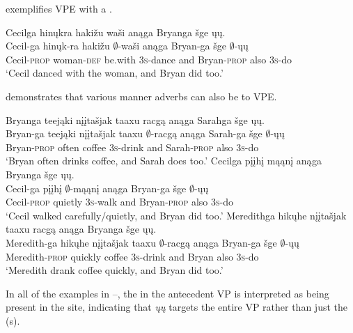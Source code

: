 \documentclass[output=paper]{LSP/langsci}
\begin{document}
 exemplifies VPE with a .
 
\ea\label{ex:johnson:9} 
\glll Cecilga {\ob}{\sVP} hinųkra hakižu waši{\cb} anąga Bryanga šge {\ob}ųų{\cb}.\\
Cecil-ga {} hinųk-ra hakižu $\emptyset$-waši anąga Bryan-ga šge {\db}$\emptyset$-ųų\\
Cecil-\textsc{prop} {} woman-\textsc{def} be.with \textsc{3s}-dance and Bryan-\textsc{prop} also {\db}\textsc{3s}-do\\
\trans `Cecil danced with the woman, and Bryan did too.'
\z

 demonstrates that various manner adverbs can also be  to VPE.
 
\ea\label{ex:johnson:10}
\ea 
\glll Bryanga  {\ob}{\sVP} teejąki {nįįtašjak taaxu} racgą{\cb} anąga Sarahga šge {\ob}ųų{\cb}.\\ 
Bryan-ga {} teejąki {nįįtašjak taaxu} $\emptyset$-racgą anąga Sarah-ga šge {\db}$\emptyset$-ųų\\
Bryan-\textsc{prop} {} often coffee \textsc{3s}-drink and Sarah-\textsc{prop} also {\db}\textsc{3s}-do\\
\trans `Bryan often drinks coffee, and Sarah does too.'
\ex 
\glll Cecilga  {\ob}{\sVP} pįįhį mąąnį{\cb} anąga Bryanga šge {\ob}ųų{\cb}.\\
Cecil-ga {} pįįhį $\emptyset$-mąąnį anąga Bryan-ga šge {\db}$\emptyset$-ųų\\
Cecil-\textsc{prop} {} quietly \textsc{3s}-walk and Bryan-\textsc{prop} also {\db}\textsc{3s}-do\\
\trans `Cecil walked carefully/quietly, and Bryan did too.'
\ex 
\glll Meredithga {\ob}{\sVP} hikųhe {nįįtašjak taaxu} racgą{\cb} anąga Bryanga šge {\ob}ųų{\cb}.\\
Meredith-ga {} hikųhe {nįįtašjak taaxu} $\emptyset$-racgą anąga Bryan-ga šge {\db}$\emptyset$-ųų\\
Meredith-\textsc{prop} {} quickly coffee \textsc{3s}-drink and Bryan also {\db}\textsc{3s}-do\\
\trans `Meredith drank coffee quickly, and Bryan did too.'
\z
\z

In all of the examples in --, the  in the antecedent VP is interpreted as being present in the  site, indicating that \emph{ųų} targets the entire VP rather than just the (s).
\end{document}

